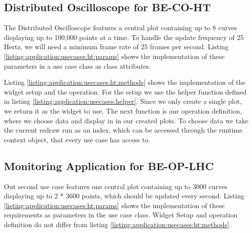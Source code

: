 

\subsection{Distributed Oscilloscope for BE-CO-HT}

The Distributed Oscilloscope features a central plot containing up to 8 curves
displaying up to 100,000 points at a time. To handle the update frequency of 25
Hertz, we will need a minimum frame rate of 25 frames per second. Listing
\ref{listing:application:usecases:ht:params} shows the implementation of these
parameters in a use case class as class attributes.



Listing \ref{listing:application:usecases:ht:methods} shows the implementation
of the widget setup and the operation. For the setup we use the helper function
defined in listing \ref{listing:application:usecases:helper}. Since we only
create a single plot, we return it as the widget to use. The next function is
our operation definition, where we choose data and display in in our created
plots. To choose data we take the current redraw run as an index, which can be
accessed through the runtime context object, that every use case has access to.



\subsection{Monitoring Application for BE-OP-LHC}

Out second use case features one central plot containing up to 3000 curves
displaying up to 2 * 3600 points, which should be updated every second. Listing
\ref{listing:application:usecases:ht:params} shows the implementation of these
requirements as parameters in the use case class. Widget Setup and operation
definition do not differ from listing
\ref{listing:application:usecases:ht:methods}.

